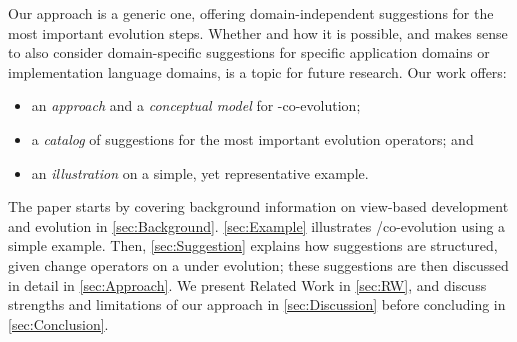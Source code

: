 Our approach is a generic one, offering domain-independent suggestions for the most important \metamodel evolution steps. Whether and how it is possible, and makes sense to also consider domain-specific suggestions for specific application domains or implementation language domains, is a topic for future research. %
Our work offers:%
\begin{itemize}
    \item an \textit{approach} and a \textit{conceptual model} for \metamodel-\viewtype co-evolution;
    \item a \textit{catalog} of suggestions for the most important evolution operators; and
    \item an \textit{illustration} on a simple, yet representative example.
\end{itemize}

The paper starts by covering background information on view-based development and
\metamodel evolution in \cref{sec:Background}. \cref{sec:Example} illustrates \metamodel/\viewtype co-evolution using a simple example.
Then, \cref{sec:Suggestion} explains how \viewtype suggestions are structured, given
change operators on a \metamodel under evolution; these suggestions are then discussed in detail in \cref{sec:Approach}. We present Related Work in \cref{sec:RW}, and discuss strengths and limitations of our approach in \cref{sec:Discussion} before concluding in \cref{sec:Conclusion}.
